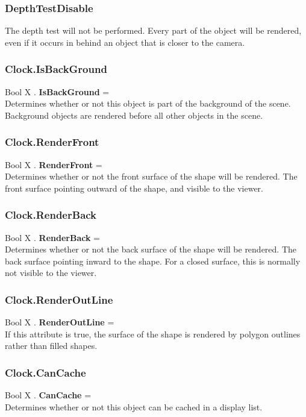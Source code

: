 \subsubsection{DepthTestDisable \label{T:DepthTest|DepthTestDisable}}
The depth test will not be performed. Every part of the object will be rendered, even if it occurs in behind an object that is closer to the camera.

\subsubsection{Clock.IsBackGround \label{F:Clock:IsBackGround}}
Bool X . \textbf{IsBackGround} = \\
Determines whether or not this object is part of the background of the scene. Background objects are rendered before all other objects in the scene.

\subsubsection{Clock.RenderFront \label{F:Clock:RenderFront}}
Bool X . \textbf{RenderFront} = \\
Determines whether or not the front surface of the shape will be rendered. The front surface pointing outward of the shape, and visible to the viewer.

\subsubsection{Clock.RenderBack \label{F:Clock:RenderBack}}
Bool X . \textbf{RenderBack} = \\
Determines whether or not the back surface of the shape will be rendered. The back surface pointing inward to the shape. For a closed surface, this is normally not visible to the viewer.

\subsubsection{Clock.RenderOutLine \label{F:Clock:RenderOutLine}}
Bool X . \textbf{RenderOutLine} = \\
If this attribute is true, the surface of the shape is rendered by polygon outlines rather than filled shapes.

\subsubsection{Clock.CanCache \label{F:Clock:CanCache}}
Bool X . \textbf{CanCache} = \\
Determines whether or not this object can be cached in a display list.

